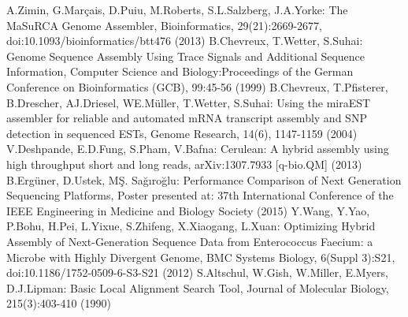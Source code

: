 \documentclass{llncs}
\begin{document}
\begin{thebibliography}{}
 A.Zimin, G.Mar\c{c}ais, D.Puiu, M.Roberts, S.L.Salzberg, J.A.Yorke: The MaSuRCA Genome Assembler, Bioinformatics, {29(21)}:2669-2677, doi:10.1093/bioinformatics/btt476 (2013)
 B.Chevreux, T.Wetter, S.Suhai:  Genome Sequence Assembly Using Trace Signals and Additional Sequence Information, Computer Science and Biology:Proceedings of the German Conference on Bioinformatics (GCB), {99}:45-56 (1999)
 B.Chevreux, T.Pfisterer, B.Drescher, AJ.Driesel, WE.Müller, T.Wetter, S.Suhai: Using the miraEST assembler for reliable and automated mRNA transcript assembly and SNP detection in sequenced ESTs, Genome Research, 14(6), 1147-1159 (2004)
 V.Deshpande, E.D.Fung, S.Pham, V.Bafna: Cerulean: A hybrid assembly using high throughput short and long reads, arXiv:1307.7933 [q-bio.QM] (2013)
 B.Ergüner, D.Ustek, MŞ. Sağıroğlu: Performance Comparison of Next Generation Sequencing Platforms, Poster presented at: 37th International Conference of the IEEE Engineering in Medicine and Biology Society (2015)
 Y.Wang, Y.Yao, P.Bohu, H.Pei, L.Yixue, S.Zhifeng, X.Xiaogang, L.Xuan: Optimizing Hybrid Assembly of Next-Generation Sequence Data from Enterococcus Faecium: a Microbe with Highly Divergent Genome, BMC Systems Biology, {6(Suppl 3)}:S21, doi:10.1186/1752-0509-6-S3-S21 (2012)
 S.Altschul, W.Gish, W.Miller, E.Myers, D.J.Lipman: Basic Local Alignment Search Tool, Journal of Molecular Biology, {215(3)}:403-410 (1990)




\end{thebibliography}
\clearpage
{} %
\renewcommand{\indexname}{Author Index}
\printindex
\clearpage
{} %
\renewcommand{\indexname}{Subject Index}
%
\end{document}

